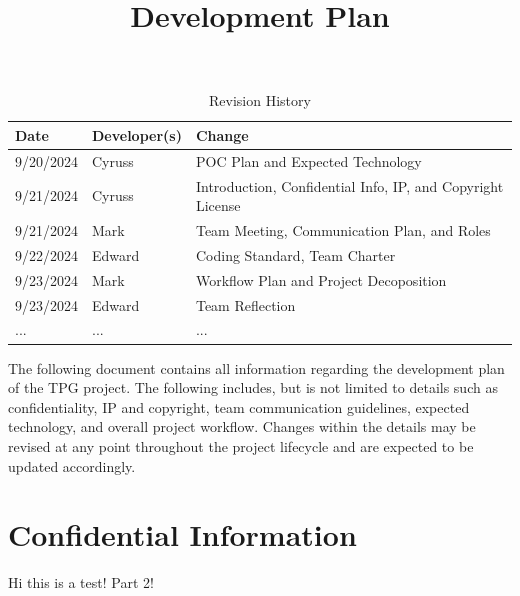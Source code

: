 \documentclass{article}
\title{Development Plan\\\progname}
\author{\authname}
\date{}
\begin{document}
\maketitle

\begin{table}[hp]
\caption{Revision History} \label{TblRevisionHistory}
\begin{tabularx}{\textwidth}{llX}
\toprule
\textbf{Date} & \textbf{Developer(s)} & \textbf{Change}\\
\midrule
9/20/2024 & Cyruss & POC Plan and Expected Technology\\
9/21/2024 & Cyruss & Introduction, Confidential Info, IP, and Copyright License\\
9/21/2024 & Mark & Team Meeting, Communication Plan, and Roles\\
9/22/2024 & Edward & Coding Standard, Team Charter\\
9/23/2024 & Mark & Workflow Plan and Project Decoposition\\
9/23/2024 & Edward & Team Reflection\\
... & ... & ...\\
\bottomrule
\end{tabularx}
\end{table}

\newpage{}



\noindent The following document contains all information regarding the development plan of the TPG project. The following includes, but is not limited to details such as confidentiality, IP and copyright, team communication guidelines, expected technology, and overall project workflow. Changes within the details may be revised at any point throughout the project lifecycle and are expected to be updated accordingly.
\section{Confidential Information}

Hi this is a test! Part 2!

\end{document}
